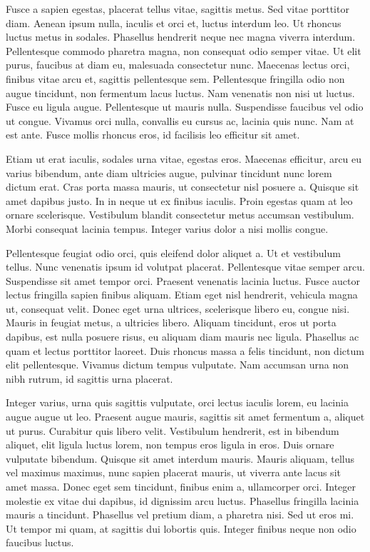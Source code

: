Fusce a sapien egestas, placerat tellus vitae, sagittis metus. Sed vitae porttitor diam. Aenean ipsum nulla, iaculis et orci et, luctus interdum leo. Ut rhoncus luctus metus in sodales. Phasellus hendrerit neque nec magna viverra interdum. Pellentesque commodo pharetra magna, non consequat odio semper vitae. Ut elit purus, faucibus at diam eu, malesuada consectetur nunc. Maecenas lectus orci, finibus vitae arcu et, sagittis pellentesque sem. Pellentesque fringilla odio non augue tincidunt, non fermentum lacus luctus. Nam venenatis non nisi ut luctus. Fusce eu ligula augue. Pellentesque ut mauris nulla. Suspendisse faucibus vel odio ut congue. Vivamus orci nulla, convallis eu cursus ac, lacinia quis nunc. Nam at est ante. Fusce mollis rhoncus eros, id facilisis leo efficitur sit amet.

Etiam ut erat iaculis, sodales urna vitae, egestas eros. Maecenas efficitur, arcu eu varius bibendum, ante diam ultricies augue, pulvinar tincidunt nunc lorem dictum erat. Cras porta massa mauris, ut consectetur nisl posuere a. Quisque sit amet dapibus justo. In in neque ut ex finibus iaculis. Proin egestas quam at leo ornare scelerisque. Vestibulum blandit consectetur metus accumsan vestibulum. Morbi consequat lacinia tempus. Integer varius dolor a nisi mollis congue.

Pellentesque feugiat odio orci, quis eleifend dolor aliquet a. Ut et vestibulum tellus. Nunc venenatis ipsum id volutpat placerat. Pellentesque vitae semper arcu. Suspendisse sit amet tempor orci. Praesent venenatis lacinia luctus. Fusce auctor lectus fringilla sapien finibus aliquam. Etiam eget nisl hendrerit, vehicula magna ut, consequat velit. Donec eget urna ultrices, scelerisque libero eu, congue nisi. Mauris in feugiat metus, a ultricies libero. Aliquam tincidunt, eros ut porta dapibus, est nulla posuere risus, eu aliquam diam mauris nec ligula. Phasellus ac quam et lectus porttitor laoreet. Duis rhoncus massa a felis tincidunt, non dictum elit pellentesque. Vivamus dictum tempus vulputate. Nam accumsan urna non nibh rutrum, id sagittis urna placerat.

Integer varius, urna quis sagittis vulputate, orci lectus iaculis lorem, eu lacinia augue augue ut leo. Praesent augue mauris, sagittis sit amet fermentum a, aliquet ut purus. Curabitur quis libero velit. Vestibulum hendrerit, est in bibendum aliquet, elit ligula luctus lorem, non tempus eros ligula in eros. Duis ornare vulputate bibendum. Quisque sit amet interdum mauris. Mauris aliquam, tellus vel maximus maximus, nunc sapien placerat mauris, ut viverra ante lacus sit amet massa. Donec eget sem tincidunt, finibus enim a, ullamcorper orci. Integer molestie ex vitae dui dapibus, id dignissim arcu luctus. Phasellus fringilla lacinia mauris a tincidunt. Phasellus vel pretium diam, a pharetra nisi. Sed ut eros mi. Ut tempor mi quam, at sagittis dui lobortis quis. Integer finibus neque non odio faucibus luctus.

